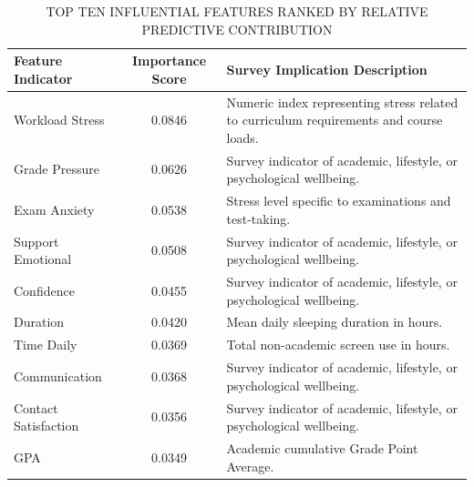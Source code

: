 \begin{table}[htbp]
\centering
\caption{\uppercase{Top Ten Influential Features Ranked by Relative Predictive Contribution}}
\label{tab:feature_importance}
\begin{tabular}{lcl}
\hline
\textbf{Feature Indicator} & \textbf{Importance Score} & \textbf{Survey Implication Description} \\
\hline
Workload Stress & 0.0846 & Numeric index representing stress related to curriculum requirements and course loads. \\
Grade Pressure & 0.0626 & Survey indicator of academic, lifestyle, or psychological wellbeing. \\
Exam Anxiety & 0.0538 & Stress level specific to examinations and test-taking. \\
Support Emotional & 0.0508 & Survey indicator of academic, lifestyle, or psychological wellbeing. \\
Confidence & 0.0455 & Survey indicator of academic, lifestyle, or psychological wellbeing. \\
Duration & 0.0420 & Mean daily sleeping duration in hours. \\
Time Daily & 0.0369 & Total non-academic screen use in hours. \\
Communication & 0.0368 & Survey indicator of academic, lifestyle, or psychological wellbeing. \\
Contact Satisfaction & 0.0356 & Survey indicator of academic, lifestyle, or psychological wellbeing. \\
GPA & 0.0349 & Academic cumulative Grade Point Average. \\
\hline
\end{tabular}
\end{table}
